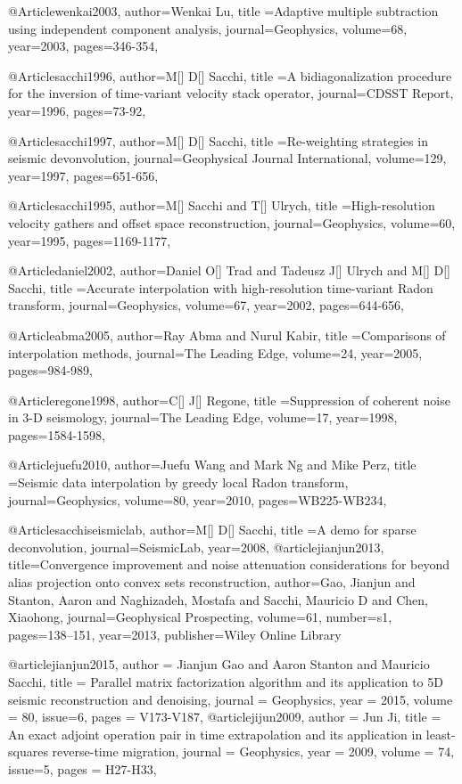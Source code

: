 @Article{wenkai2003,
  author={Wenkai Lu},
  title ={Adaptive multiple subtraction using independent component analysis},
  journal={Geophysics},
  volume=68,
  year=2003,
  pages={346-354},
}

@Article{sacchi1996,
  author={M[] D[] Sacchi},
  title ={A bidiagonalization procedure for the inversion of time-variant velocity stack operator},
  journal={CDSST Report},
  year=1996,
  pages={73-92},
}

@Article{sacchi1997,
  author={M[] D[] Sacchi},
  title ={Re-weighting strategies in seismic devonvolution},
  journal={Geophysical Journal International},
  volume=129,
  year=1997,
  pages={651-656},
}

@Article{sacchi1995,
  author={M[] Sacchi and T[] Ulrych},
  title ={High-resolution velocity gathers and offset space reconstruction},
  journal={Geophysics},
  volume=60,
  year=1995,
  pages={1169-1177},
}

@Article{daniel2002,
  author={Daniel O[] Trad and Tadeusz J[] Ulrych and M[] D[] Sacchi},
  title ={Accurate interpolation with high-resolution time-variant Radon transform},
  journal={Geophysics},
  volume=67,
  year=2002,
  pages={644-656},
}

@Article{abma2005,
  author={Ray Abma and Nurul Kabir},
  title ={Comparisons of interpolation methods},
  journal={The Leading Edge},
  volume=24,
  year=2005,
  pages={984-989},
}

@Article{regone1998,
  author={C[] J[] Regone},
  title ={Suppression of coherent noise in 3-{D} seismology},
  journal={The Leading Edge},
  volume=17,
  year=1998,
  pages={1584-1598},
}

@Article{juefu2010,
  author={Juefu Wang and Mark Ng and Mike Perz},
  title ={Seismic data interpolation by greedy local Radon transform},
  journal={Geophysics},
  volume=80,
  year=2010,
  pages={WB225-WB234},
}

@Article{sacchiseismiclab,
  author={M[] D[] Sacchi},
  title ={A demo for sparse deconvolution},
  journal={SeismicLab},
  year={2008},
}
@article{jianjun2013,
  title={Convergence improvement and noise attenuation considerations for beyond alias projection onto convex sets reconstruction},
  author={Gao, Jianjun and Stanton, Aaron and Naghizadeh, Mostafa and Sacchi, Mauricio D and Chen, Xiaohong},
  journal={Geophysical Prospecting},
  volume={61},
  number={s1},
  pages={138--151},
  year={2013},
  publisher={Wiley Online Library}
}

@article{jianjun2015,
  author =	 {Jianjun Gao and Aaron Stanton and Mauricio Sacchi},
  title =	 {Parallel matrix factorization algorithm and its application to 5{D} seismic reconstruction and denoising},
  journal = 	 {Geophysics},
  year = 	 2015,
  volume =	 80,
    issue=6,
  pages =	 {V173-V187},
}
@article{jijun2009,
  author =	 {Jun Ji},
  title =	 {An exact adjoint operation pair in time extrapolation and its application in least-squares reverse-time migration},
  journal = 	 {Geophysics},
  year = 	 2009,
  volume =	 74,
    issue=5,
  pages =	 {H27-H33},
}

